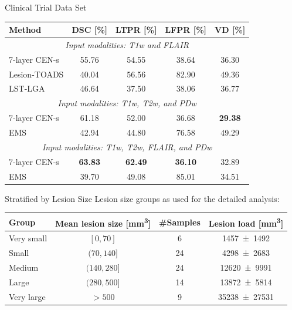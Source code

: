 \documentclass{beamer}
\begin{document}
\begin{frame}{Clinical Trial Data Set}
\begin{center}
\begin{tabular}{@{}lcccc@{}}
\toprule
Method & DSC [\%] & LTPR [\%] & LFPR [\%] & VD [\%] \\
\midrule
\multicolumn{5}{c}{\textit{Input modalities: T1w and FLAIR}} \\
\midrule
7-layer CEN-s & 55.76 & 54.55 & 38.64 & 36.30 \\[0.2em]
Lesion-TOADS & 40.04 & 56.56 & 82.90 & 49.36 \\ 
LST-LGA & 46.64 & 37.50 & 38.06 & 36.77 \\
\midrule
\multicolumn{5}{c}{\textit{Input modalities: T1w, T2w, and PDw}} \\
\midrule
7-layer CEN-s & 61.18 & 52.00 & 36.68 & \bfseries 29.38 \\
EMS & 42.94 & 44.80 & 76.58 & 49.29 \\
\midrule
\multicolumn{5}{c}{\textit{Input modalities: T1w, T2w, FLAIR, and PDw}} \\
\midrule
7-layer CEN-s & \bfseries 63.83 & \bfseries 62.49 & \bfseries 36.10 & 32.89 \\
EMS & 39.70 & 49.08 & 85.01 & 34.51 \\
\bottomrule
\end{tabular}
\end{center}
\end{frame}

\begin{frame}{Stratified by Lesion Size}
Lesion size groups as used for the detailed analysis:

\begin{center}
\small
\begin{tabular}{@{}lccc@{}}
\toprule
Group & Mean lesion size [\si{\cubic\milli\metre}] & \#Samples & Lesion
load [\si{\cubic\milli\metre}] \\
\midrule
Very small & $[0,70]$ & 6 & \num{1457+-1492} \\
Small      & $(70,140]$ & 24 & \num{4298+-2683} \\
Medium & $(140,280]$ & 24 & \num{12620+-9991} \\
Large & $(280,500]$ & 14 & \num{13872+-5814} \\
Very large & $> 500$ & 9 & \num{35238+-27531} \\
\bottomrule
\end{tabular}
\end{center}
\end{frame}
\end{document}
